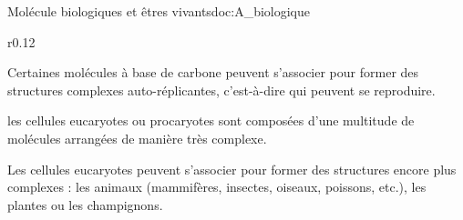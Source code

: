 \begin{doc}{Molécule biologiques et êtres vivants}{doc:A_biologique}
  \begin{wrapfigure}[2]{r}{0.12\linewidth}
    \vspace*{-28pt}
    \centering  
  \end{wrapfigure}
  \strut\vspace*{-20pt}
  
  \begin{importants}
    Certaines molécules à base de carbone peuvent s'associer pour former des structures complexes auto-réplicantes, c'est-à-dire qui peuvent se reproduire.
  \end{importants}
  \exemple* les cellules eucaryotes ou procaryotes sont composées d'une multitude de molécules arrangées de manière très complexe.

  \begin{importants}
    Les cellules eucaryotes peuvent s'associer pour former des structures encore plus complexes : les animaux (mammifères, insectes, oiseaux, poissons, etc.), les plantes ou les champignons.
  \end{importants}

  \vspace*{-14pt}
  \begin{center}
  \end{center}
\end{doc}